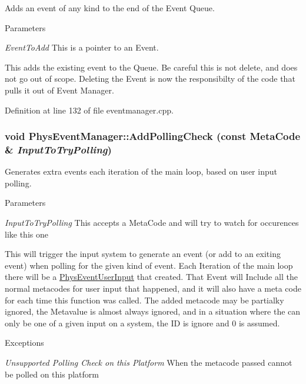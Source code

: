 Adds an event of any kind to the end of the Event Queue. 


\begin{DoxyParams}{Parameters}
\item[{\em EventToAdd}]This is a pointer to an Event.\end{DoxyParams}
This adds the existing event to the Queue. Be careful this is not delete, and does not go out of scope. Deleting the Event is now the responsibilty of the code that pulls it out of Event Manager. 

Definition at line 132 of file eventmanager.cpp.

\hypertarget{classPhysEventManager_a1e99385441c5377a741561db581ef3ae}{
\subsubsection[{AddPollingCheck}]{\setlength{\rightskip}{0pt plus 5cm}void PhysEventManager::AddPollingCheck (const {\bf MetaCode} \& {\em InputToTryPolling})}}
\label{d5/dd7/classPhysEventManager_a1e99385441c5377a741561db581ef3ae}


Generates extra events each iteration of the main loop, based on user input polling. 


\begin{DoxyParams}{Parameters}
\item[{\em InputToTryPolling}]This accepts a MetaCode and will try to watch for occurences like this one\end{DoxyParams}
This will trigger the input system to generate an event (or add to an exiting event) when polling for the given kind of event. Each Iteration of the main loop there will be a \hyperlink{classPhysEventUserInput}{PhysEventUserInput} that created. That Event will Include all the normal metacodes for user input that happened, and it will also have a meta code for each time this function was called. The added metacode may be partialky ignored, the Metavalue is almost always ignored, and in a situation where the can only be one of a given input on a system, the ID is ignore and 0 is assumed. 
\begin{DoxyExceptions}{Exceptions}
\item[{\em Unsupported Polling Check on this Platform}]When the metacode passed cannot be polled on this platform \end{DoxyExceptions}


